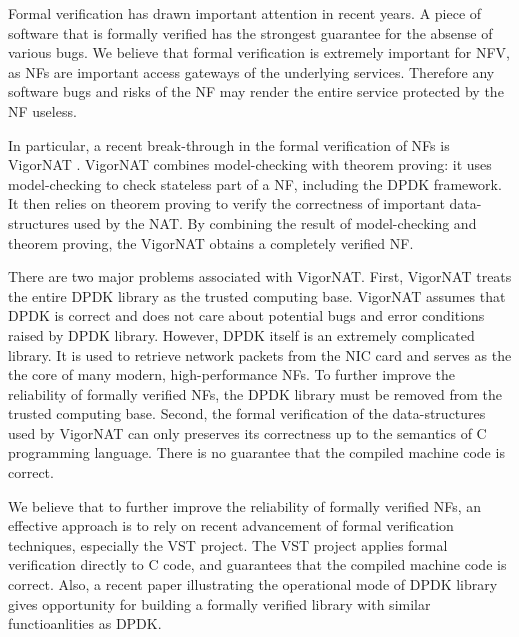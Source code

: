 Formal verification has drawn important attention in recent years. A piece of software that is formally verified has the strongest guarantee for the absense of various bugs. We believe that formal verification is extremely important for NFV, as NFs are important access gateways of the underlying services. Therefore any software bugs and risks of the NF may render the entire service protected by the NF useless.

In particular, a recent break-through in the formal verification of NFs is VigorNAT \cite{}. VigorNAT combines model-checking with theorem proving: it uses model-checking to check stateless part of a NF, including the DPDK framework. It then relies on theorem proving to verify the correctness of important data-structures used by the NAT. By combining the result of model-checking and theorem proving, the VigorNAT obtains a completely verified NF.

There are two major problems associated with VigorNAT. First, VigorNAT treats the entire DPDK library as the trusted computing base. VigorNAT assumes that DPDK is correct and does not care about potential bugs and error conditions raised by DPDK library. However, DPDK itself is an extremely complicated library. It is used to retrieve network packets from the NIC card and serves as the the core of many modern, high-performance NFs. To further improve the reliability of formally verified NFs, the DPDK library must be removed from the trusted computing base. Second, the formal verification of the data-structures used by VigorNAT can only preserves its correctness up to the semantics of C programming language. There is no guarantee that the compiled machine code is correct.

We believe that to further improve the reliability of formally verified NFs, an effective approach is to rely on recent advancement of formal verification techniques, especially the VST project. The VST project applies formal verification directly to C code, and guarantees that the compiled machine code is correct. Also, a recent paper illustrating the operational mode of DPDK library gives opportunity for building a formally verified library with similar functioanlities as DPDK. 


